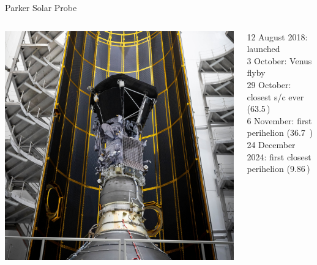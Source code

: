\begin{frame}[c]{Parker Solar Probe}{}
	\begin{columns}[c]
		
		\includegraphics[width=\textwidth]{../figures_of_others/images/PSP_fencap2_square.jpg}


		12 August 2018: launched\\
		3 October: Venus flyby\\
		29 October: closest s/c ever (63.5\,\Rs{})\\
		6 November: first perihelion (36.7~\Rs{})\\
		24 December 2024: first closest perihelion (9.86\,\Rs{})
	\end{columns}
\end{frame}
